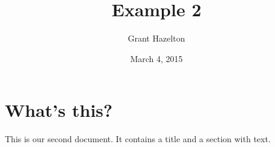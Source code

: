 \documentclass[a4paper,11pt]{article}
\begin{document}
\title{Example 2}
\author{Grant Hazelton}
\date{March 4, 2015}
\maketitle
\section{What's this?}
This is our second document. It contains a title and a section with text.
\end{document}
